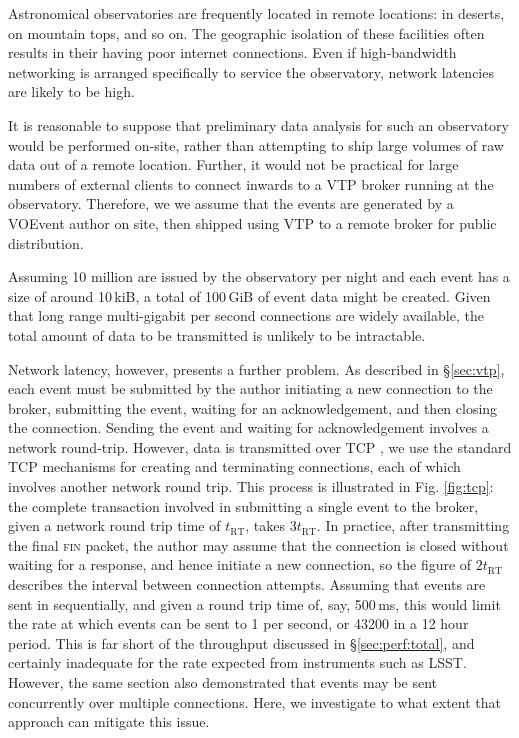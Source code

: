 \documentclass[5p,authoryear]{elsarticle}
\begin{document}
Astronomical observatories are frequently located in remote locations: in
deserts, on mountain tops, and so on. The geographic isolation of these
facilities often results in their having poor internet connections. Even if
high-bandwidth networking is arranged specifically to service the observatory,
network latencies are likely to be high.

It is reasonable to suppose that preliminary data analysis for such an
observatory would be performed on-site, rather than attempting to ship large
volumes of raw data out of a remote location. Further, it would not be
practical for large numbers of external clients to connect inwards to a
VTP broker running at the observatory. Therefore, we we assume that the events
are generated by a VOEvent author on site, then shipped using VTP to a remote
broker for public distribution.

Assuming 10 million are issued by the observatory per night and each event
has a size of around 10\,kiB, a total of 100\,GiB of event data might be
created. Given that long range multi-gigabit per second connections are widely
available, the total amount of data to be transmitted is unlikely to be
intractable.

Network latency, however, presents a further problem. As described in
\S\ref{sec:vtp}, each event must be submitted by the author initiating a new
connection to the broker, submitting the event, waiting for an
acknowledgement, and then closing the connection. Sending the event and
waiting for acknowledgement involves a network round-trip.  However, data is
transmitted over TCP \citep{Cerf:1974}, we use the standard TCP mechanisms for
creating and terminating connections, each of which involves another network
round trip. This process is illustrated in Fig. \ref{fig:tcp}: the complete
transaction involved in submitting a single event to the broker, given a
network round trip time of $t_\mathrm{RT}$, takes $3 t_\mathrm{RT}$. In
practice, after transmitting the final \textsc{fin} packet, the author may
assume that the connection is closed without waiting for a response, and hence
initiate a new connection, so the figure of $2 t_\mathrm{RT}$ describes the
interval between connection attempts.  Assuming that events are sent in
sequentially, and given a round trip time of, say, 500\,ms, this would limit
the rate at which events can be sent to 1 per second, or 43200 in a 12 hour
period. This is far short of the throughput discussed in
\S\ref{sec:perf:total}, and certainly inadequate for the rate expected from
instruments such as LSST.  However, the same section also demonstrated that
events may be sent concurrently over multiple connections. Here, we
investigate to what extent that approach can mitigate this issue.
\end{document}
